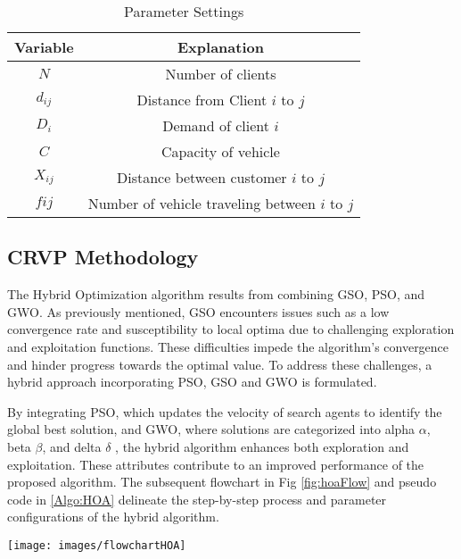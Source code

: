 \documentclass[conference]{IEEEtran}
\begin{document}
\begin{abstract1}
   
\begin{table}[h]
\caption{Parameter Settings}
\begin{center}
	\begin{tabular}{|c|c|}
		
		\hline
		Variable	 &  Explanation\\ \hline
		$N$ &  Number of clients\\ \hline
		 $d_{ij}$	 &  Distance from Client $i$ to $j$\\ \hline
		$D_{i}$	 &  Demand of client $i$\\ \hline
		 $C$	 &  Capacity of vehicle\\ \hline
		 $X_{ij}$	 & Distance between customer $i$ to $j$\\ \hline
		 $fij$ &  Number of vehicle traveling between $i$ to $j$\\ \hline
		
		
	\end{tabular}
	\label{tabCVRPPara}
\end{center}
\end{table}
 
  \subsection{CRVP Methodology}
 The Hybrid Optimization algorithm results from combining GSO, PSO, and GWO. As previously mentioned, GSO encounters issues such as a low convergence rate and susceptibility to local optima due to challenging exploration and exploitation functions. These difficulties impede the algorithm's convergence and hinder progress towards the optimal value. To address these challenges, a hybrid approach incorporating PSO, GSO and GWO is formulated.
 
 By integrating PSO, which updates the velocity of search agents to identify the global best solution, and GWO, where solutions are categorized into alpha $\alpha$, beta $\beta$, and delta $\delta$ , the hybrid algorithm enhances both exploration and exploitation. These attributes contribute to an improved performance of the proposed algorithm. The subsequent flowchart in Fig \ref{fig:hoaFlow} and pseudo code in \ref{Algo:HOA} delineate the step-by-step process and parameter configurations of the hybrid algorithm.
 
 
 \begin{strip} %
 	\texttt{[image: images/flowchartHOA]}
 	\label{fig:hoaFlow}
 \end{strip}
 

\end{abstract1}
\end{document}
